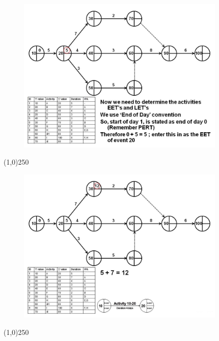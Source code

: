 \begin{frame}
\begin{figure}
	\centering
		\includegraphics[width = 10.0cm]{oldnotes/Slide102.jpg}
\end{figure}
\end{frame}
\begin{center}\line(1,0){250}\end{center}


\begin{frame}
\begin{figure}
	\centering
		\includegraphics[width = 10.0cm]{oldnotes/Slide103.jpg}
\end{figure}
\end{frame}
\begin{center}\line(1,0){250}\end{center}


